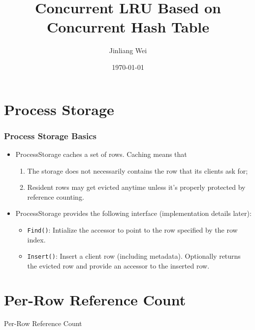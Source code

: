 \documentclass{beamer}
\begin{document}
\title{Concurrent LRU Based on Concurrent Hash Table} 
\author{Jinliang Wei} 
\date{\today} 

\frame{\titlepage} 


\section{Process Storage}

\begin{frame}
\frametitle{Process Storage Basics}
\begin{itemize}
\item ProcessStorage caches a set of rows. Caching means that 
\begin{enumerate}
\item The storage does not necessarily contains the row that its clients ask for;
\item Resident rows may get evicted anytime unless it's properly protected by 
reference counting. 
\end{enumerate}

\item ProcessStorage provides the following interface (implementation details 
  later):

\begin{itemize}
\item \texttt{Find()}: Intialize the accessor to point to the row specified by 
  the row index. 
\item \texttt{Insert()}: Insert a client row (including metadata). Optionally 
returns the evicted row and provide an accessor to the inserted row.
\end{itemize}

\end{itemize}

\end{frame}

\section{Per-Row Reference Count}

\begin{frame}
Per-Row Reference Count
\end{frame}
\end{document}
